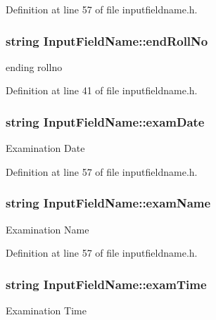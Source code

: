 Definition at line 57 of file inputfieldname.\-h.

\hypertarget{classInputFieldName_a06435f9ba5a529cbba4ee1ce9b02e5cc}{
\subsubsection[{end\-Roll\-No}]{\setlength{\rightskip}{0pt plus 5cm}string Input\-Field\-Name\-::end\-Roll\-No}}\label{classInputFieldName_a06435f9ba5a529cbba4ee1ce9b02e5cc}
ending rollno 

Definition at line 41 of file inputfieldname.\-h.

\hypertarget{classInputFieldName_a4e60d793497c36b2d80e2411cbb915d8}{
\subsubsection[{exam\-Date}]{\setlength{\rightskip}{0pt plus 5cm}string Input\-Field\-Name\-::exam\-Date}}\label{classInputFieldName_a4e60d793497c36b2d80e2411cbb915d8}
Examination Date 

Definition at line 57 of file inputfieldname.\-h.

\hypertarget{classInputFieldName_a4cee41667cdc0e38f8f76af94ef39c36}{
\subsubsection[{exam\-Name}]{\setlength{\rightskip}{0pt plus 5cm}string Input\-Field\-Name\-::exam\-Name}}\label{classInputFieldName_a4cee41667cdc0e38f8f76af94ef39c36}
Examination Name 

Definition at line 57 of file inputfieldname.\-h.

\hypertarget{classInputFieldName_ab667062be019e5912683d33c45885bd3}{
\subsubsection[{exam\-Time}]{\setlength{\rightskip}{0pt plus 5cm}string Input\-Field\-Name\-::exam\-Time}}\label{classInputFieldName_ab667062be019e5912683d33c45885bd3}
Examination Time 

